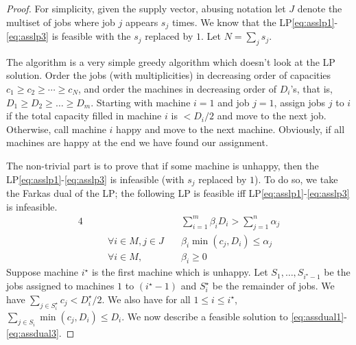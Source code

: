 \documentclass{article}[11pt]
\begin{document}
\begin{proof}
For simplicity, given the supply vector, abusing notation let $J$ denote the multiset of jobs where job $j$ appears $s_j$ times. We know that the LP\eqref{eq:asslp1}-\eqref{eq:asslp3} is feasible with the $s_j$ replaced by $1$. Let $N = \sum_j s_j$. 

The algorithm is a  very simple greedy algorithm which doesn't look at the LP solution.  Order the jobs (with multiplicities) in decreasing order of capacities $c_1\geq c_2 \geq \cdots \geq c_N$, and order the machines in decreasing order of $D_i$'s, that is, $D_1 \geq D_2 \geq \ldots \geq D_m$. 
Starting with machine $i=1$ and job $j=1$, assign jobs $j$ to $i$ if the total capacity filled in machine $i$ is $< D_i/2$ and move to the next job. Otherwise, call machine $i$ happy and move to the next machine. Obviously, if all machines are happy at the end we have found our assignment. 

The non-trivial part is to  prove that if some machine is unhappy, then the LP\eqref{eq:asslp1}-\eqref{eq:asslp3} is infeasible (with $s_j$ replaced by $1$).
To do so, we take the Farkas dual of the LP; the following LP is feasible iff LP\eqref{eq:asslp1}-\eqref{eq:asslp3} is infeasible.
	\begin{alignat}{4}
		&&   & \quad \textstyle \sum_{i=1}^m \beta_i D_i > \sum_{j=1}^n\alpha_j \label{eq:assdual1}   \\
		&& \quad \forall i\in M,j\in J & \quad \textstyle \beta_i\min(c_j,D_i) \leq \alpha_j \label{eq:assdual2}  \\
		&& \quad \forall i\in M, &\quad  \beta_i \geq 0\label{eq:assdual3}
	\end{alignat}
	\def\i{i^\star}
Suppose machine $\i$ is the first machine which is unhappy. Let $S_1,\ldots,S_{\i-1}$ be the jobs assigned to machines $1$ to $(\i-1)$ and $S_\i$ be the remainder of jobs. 
We have $\sum_{j\in S_\i} c_j < D_\i/2$. We also have for all $1\leq i\leq \i$, $\sum_{j\in S_i} \min(c_j,D_i) \leq D_i$.
We now describe a feasible solution to \eqref{eq:assdual1}-\eqref{eq:assdual3}.


\end{proof}
\end{document}
